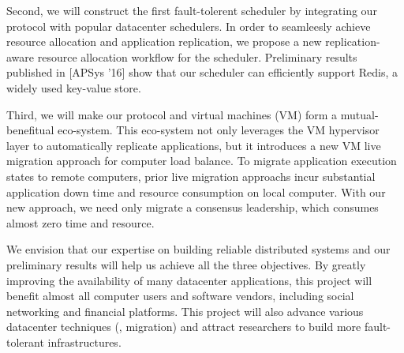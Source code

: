 
Second, we will construct the first fault-tolerent scheduler by integrating our 
protocol with popular datacenter schedulers. In order to seamleesly achieve 
resource allocation and application replication, we propose a new 
replication-aware resource allocation workflow for the scheduler. Preliminary 
results published in [APSys '16] show that our scheduler can efficiently 
support Redis, a widely used key-value store.

Third, we will make our protocol and virtual machines (VM) form a 
mutual-benefitual eco-system. This eco-system not only leverages the VM 
hypervisor layer to automatically replicate applications, but it introduces a 
new VM live migration approach for computer load balance. To migrate 
application execution states to remote computers, prior live migration 
approachs incur substantial application down time and resource consumption on 
local computer. With our new approach, we need only migrate a consensus 
leadership, which consumes almost zero time and resource.


We envision that our expertise on building reliable distributed systems and 
our preliminary results will help us achieve all the three objectives. By 
greatly improving the availability of many datacenter applications, this project 
will benefit almost all computer users and software vendors, including social 
networking and financial platforms. This project will also advance various 
datacenter techniques (\eg, migration) and attract researchers to build more 
fault-tolerant infrastructures.


